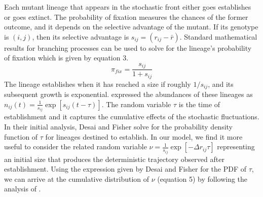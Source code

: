 \documentclass[11pt,twocolumn]{article}
\begin{document}
Each mutant lineage that appears in the stochastic front either goes establishes or goes extinct. The probability of fixation measures the chances of the former outcome, and it depends on the selective advantage of the mutant. If its genotype is $(i,j)$, then its selective advantage is $s_{ij}=(r_{ij}-\bar{r})$. Standard mathematical results for branching processes can be used to solve for the lineage's probability of fixation which is given by equation 3.
% 
% 
% 
%
\begin{equation}
\pi_{fix} = \frac{s_{ij}}{ 1+s_{ij}}
\end{equation}
The lineage establishes when it has reached a size if roughly $1/s_{ij}$, and its subsequent growth is exponential. \cite{desai2007beneficial} expressed the abundances of these lineages as $n_{ij}(t) = \frac{1}{s_{ij}} \exp[{s_{ij}(t-\tau)}]$. The random variable $\tau$ is the time of establishment and it captures the cumulative effects of the stochastic fluctuations.  In their initial analysis, Desai and Fisher solve for the probability density function of $\tau$ for lineages destined to establish. In our model, we find it more useful to consider the related random variable $\nu = \frac{1}{s_{ij}}\exp[-\Delta r_{ij}\tau]$ representing an initial size that produces the deterministic trajectory observed after establishment. Using the expression given by Desai and Fisher for the PDF of $\tau$, we can arrive at the cumulative distribution of  $\nu$ (equation 5) by following the analysis of \cite{Uecker2011}. 
% 
\end{document}
